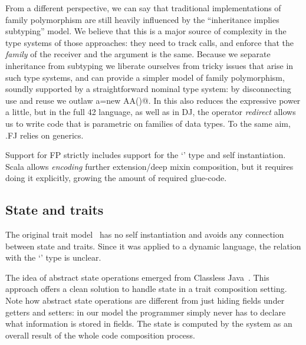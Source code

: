 From a different perspective, we can say that traditional
implementations of family polymorphism are still heavily influenced by
the ``inheritance implies subtyping'' model.
We believe that this is a major source of complexity in the type
systems of those approaches:
they need to track calls, and enforce that the \emph{family} of the receiver and the argument is the same.
Because we separate inheritance from subtyping we liberate ourselves
from tricky issues that arise in such type systems, and can
provide a simpler model of family polymorphism, soundly supported by 
a straightforward nominal type system:
by disconnecting use and reuse we outlaw \Q@A a=new AA()@.
In \name this also reduces the expressive power a little, but
in the full 42 language, as well as in DJ, the operator \emph{redirect} allows us to write code that is parametric on families of data types.
To the same aim, .FJ relies on generics.

Support for FP strictly includes
support for the `\Q@This@' type and self instantiation.
Scala allows \emph{encoding} further extension/deep mixin composition,
but it requires doing it explicitly, growing the amount of required glue-code.






\subsection{State and traits}

The original trait model~\cite{ducasse2006traits} has no self instantiation
and avoids any connection between state and traits.
Since it was applied to a dynamic language, the relation with the `\Q@This@' type is unclear.

The idea of abstract state operations emerged from Classless
Java~\cite{wang2016classless}. This approach offers a clean solution to handle state
in a trait composition setting.
Note how abstract state operations are different from just hiding fields under getters and setters: 
in our model the programmer simply never has to declare what information is stored in fields.
The state is computed by the system as an overall result of the whole code composition process.

